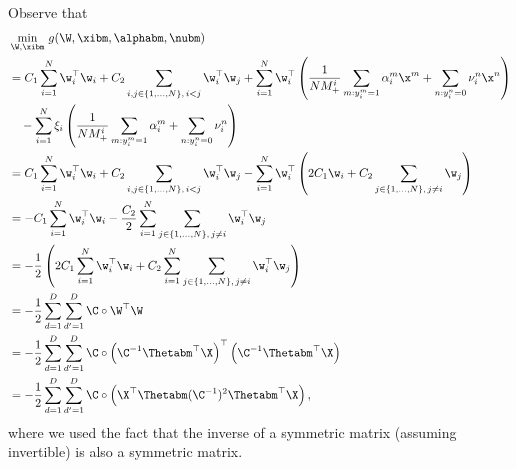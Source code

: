 Observe that
\begin{equation*}
\begin{aligned}
&\min_{\W, \xibm} \, g(\W, \xibm, \alphabm, \nubm) \\
&= C_1 \sum_{i=1}^{N} \w_i^\top \w_i + C_2 \sum_{i, j \in \{1,\dots,N\}, \, i < j} \w_i^\top \w_j
   + \sum_{i = 1}^{N} \w_i^\top \left( \frac{1}{N M_+^i} \sum_{m: y_i^m = 1} \alpha_i^m \x^m + \sum_{n: y_i^n = 0} \nu_i^n \x^n \right) \\
& \quad - \sum_{i = 1}^{N} \xi_i \left( \frac{1}{N M_+^i} \sum_{m: y_i^m = 1} \alpha_i^m + \sum_{n: y_i^n = 0} \nu_i^n \right) \\
&= C_1 \sum_{i=1}^{N} \w_i^\top \w_i + C_2 \sum_{i, j \in \{1,\dots,N\}, \, i < j} \w_i^\top \w_j 
   - \sum_{i = 1}^{N} \w_i^\top \left( 2C_1 \w_i + C_2 \sum_{j \in \{1,\dots,N\}, \, j \ne i} \w_j \right) \\
&= - C_1 \sum_{i=1}^{N} \w_i^\top \w_i - \frac{C_2}{2} \sum_{i=1}^{N} \sum_{j \in \{1,\dots,N\}, \, j \ne i} \w_i^\top \w_j \\
&= - \frac{1}{2} \left( 2C_1 \sum_{i=1}^{N} \w_i^\top \w_i + C_2 \sum_{i=1}^{N} \sum_{j \in \{1,\dots,N\}, \, j \ne i} \w_i^\top \w_j \right) \\
&= - \frac{1}{2} \sum_{d=1}^{D} \sum_{d'=1}^{D} \C \circ \W^\top \W \\
&= - \frac{1}{2} \sum_{d=1}^{D} \sum_{d'=1}^{D} \C \circ \left( \C^{-1} \Thetabm^\top \X \right)^\top  \left( \C^{-1} \Thetabm^\top \X \right) \\
&= - \frac{1}{2} \sum_{d=1}^{D} \sum_{d'=1}^{D} \C \circ \left( \X^\top \Thetabm (\C^{-1})^2 \Thetabm^\top \X \right), \\
\end{aligned}
\end{equation*}
where we used the fact that the inverse of a symmetric matrix (assuming invertible) is also a symmetric matrix.


